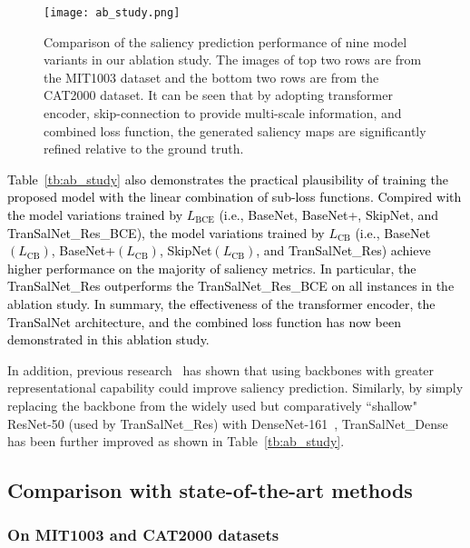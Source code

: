 \documentclass{article}
\begin{document}
\begin{figure*}
\centering
\texttt{[image: ab\_study.png]}
\caption{Comparison of the saliency prediction performance of nine model variants in our ablation study. The images of top two rows are from the MIT1003 dataset and the bottom two rows are from the CAT2000 dataset. It can be seen that by adopting transformer encoder, skip-connection to provide multi-scale information, and combined loss function, the generated saliency maps are significantly refined relative to the ground truth.}
\label{fig:ab_study}
\end{figure*}
\textcolor{black}{Table~\ref{tb:ab_study} also  demonstrates the practical plausibility of training the proposed model with the linear combination of sub-loss functions.
Compired with the model variations trained by $L_{\text{BCE}}$ (i.e., BaseNet, BaseNet+, SkipNet, and TranSalNet\_Res\_BCE), the model variations trained by $L_{\text{CB}}$ (i.e., BaseNet$(L_{\text{CB}})$, BaseNet+$(L_{\text{CB}})$, SkipNet$(L_{\text{CB}})$, and TranSalNet\_Res) achieve higher performance on the majority of saliency metrics.
In particular, the TranSalNet\_Res outperforms the TranSalNet\_Res\_BCE on all instances in the ablation study. In summary, the effectiveness of the transformer encoder, the TranSalNet architecture, and the combined loss function has now been demonstrated in this ablation study. 
}

In addition, previous research~\cite{EML-NET, DP2E} has shown that using backbones with greater representational capability could improve saliency prediction. Similarly, by simply replacing the backbone from the widely used but comparatively ``shallow" ResNet-50 (used by TranSalNet\_Res) with DenseNet-161~\cite{DenseNet}, TranSalNet\_Dense has been further improved as shown in Table~\ref{tb:ab_study}.








\subsection{Comparison with state-of-the-art methods} 
\subsubsection{On MIT1003 and CAT2000 datasets} 
\end{document}
